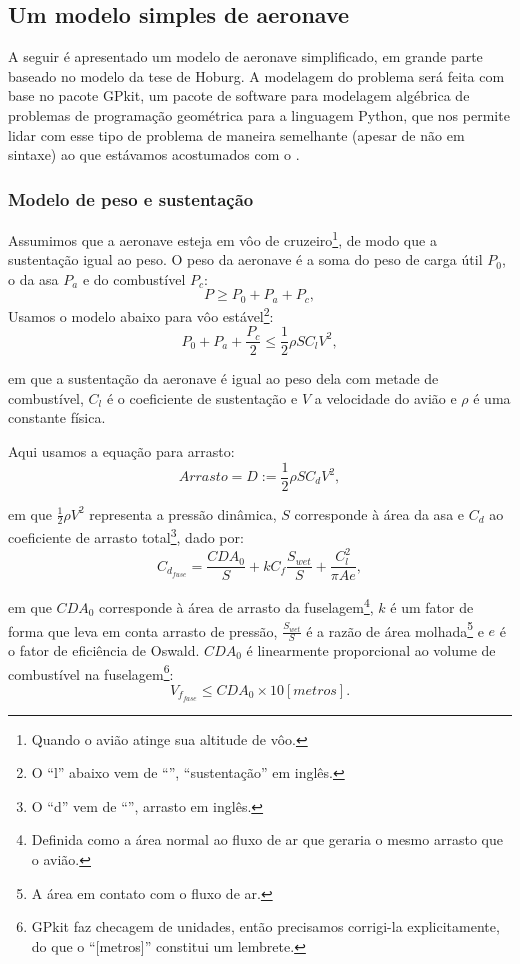 \documentclass{article}
\begin{document}
\subsection{Um modelo simples de aeronave}


A seguir é apresentado um modelo de aeronave simplificado, em grande
parte baseado no modelo da tese de Hoburg\cite{hoburg}. A modelagem do
problema será feita com base no pacote GPkit\cite{gpkit}, um
pacote de software para modelagem algébrica de problemas de
programação geométrica para a linguagem Python, que nos permite lidar
com esse tipo de problema de maneira semelhante (apesar de não em
sintaxe) ao que estávamos acostumados com o \eclipse.

\subsubsection{Modelo de peso e sustentação}

Assumimos que a aeronave esteja em vôo de cruzeiro\footnote{Quando o
  avião atinge sua altitude de vôo.}, de modo que a sustentação igual
ao peso. O peso da aeronave é a soma do peso de carga útil $P_0$, o da
asa $P_a$ e do combustível $P_c$:
\[
P \geq P_0 + P_a + P_c,
\]
Usamos o modelo abaixo para vôo estável\footnote{O ``l'' abaixo vem de
  ``'', ``sustentação'' em inglês.}:
\[
  P_0 + P_a + \frac{P_c}{2} \leq \frac{1}{2} \rho S C_l V^2,
\]

\noindent em que a sustentação da aeronave é igual ao peso dela com
metade de combustível, $C_l$ é o coeficiente de sustentação e $V$ a
velocidade do avião e $\rho$ é uma constante física.

Aqui usamos a equação para arrasto:
\[
  Arrasto = D := \frac{1}{2} \rho S C_d V^2,
\]

\noindent em que $\frac{1}{2}\rho V^2$ representa a pressão dinâmica,
$S$ corresponde à área da asa e $C_d$ ao coeficiente de arrasto
total\footnote{O ``d'' vem de ``'', arrasto em inglês.},
dado por:
\[
  C_{d_{fuse}} = \frac{CDA_0}{S} + kC_f \frac{S_{wet}}{S} +
  \frac{C_{l}^2}{\pi A e},
\]

\noindent em que $CDA_0$ corresponde à área de arrasto da
fuselagem\footnote{Definida como a área normal ao fluxo de ar que
  geraria o mesmo arrasto que o avião.}, $k$ é um fator de forma que
leva em conta arrasto de pressão, $\frac{S_{wet}}{S}$ é a razão de
área molhada\footnote{A área em contato com o fluxo de ar.} e $e$ é o
fator de eficiência de Oswald. $CDA_0$ é linearmente proporcional ao
volume de combustível na fuselagem\footnote{GPkit faz checagem de
  unidades, então precisamos corrigi-la explicitamente, do que o
  ``[metros]'' constitui um lembrete.}:
\[
  V_{f_{fase}} \leq CDA_0 \times 10 [metros].
\]
\end{document}
